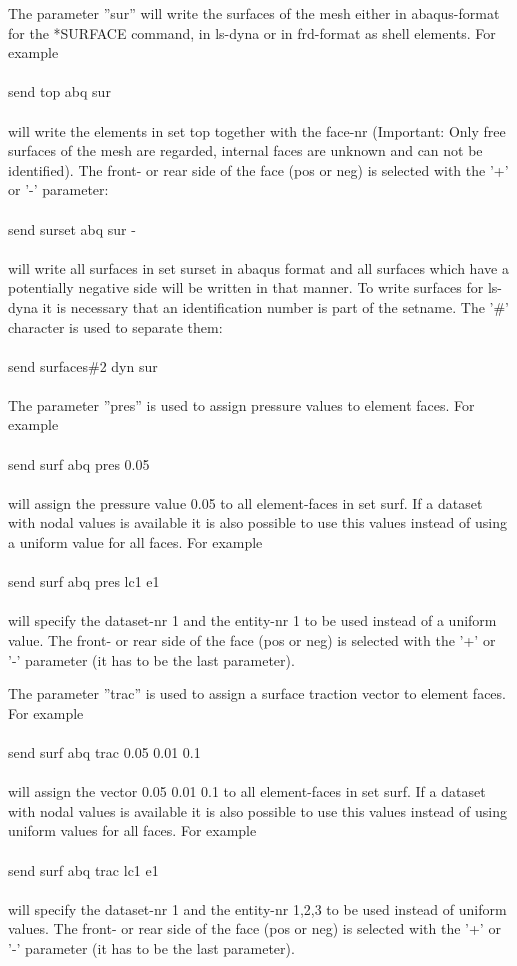 \documentclass{article}
\begin{document}
The parameter ''sur'' will write the surfaces of the mesh either in abaqus-format for the *SURFACE command, in ls-dyna or in frd-format as shell elements. For example\\\\send top abq sur\\\\will write the elements in set top together with the face-nr (Important: Only free surfaces of the mesh are regarded, internal faces are unknown and can not be identified). The front- or rear side of the face (pos or neg) is selected with the '+' or '-' parameter:\\\\send surset abq sur -\\\\will write all surfaces in set surset in abaqus format and all surfaces which have a potentially negative side will be written in that manner. To write surfaces for ls-dyna it is necessary that an identification number is part of the setname. The '\#' character is used to separate them:\\\\send surfaces\#2 dyn sur\\\\


The parameter ''pres'' is used to assign pressure values to element faces. For example\\\\send surf abq pres 0.05\\\\will assign the pressure value 0.05 to all element-faces in set surf. If a dataset with nodal values is available it is also possible to use this values instead of using a uniform value for all faces. For example\\\\send surf abq pres lc1 e1\\\\will specify the dataset-nr 1 and the entity-nr 1 to be used instead of a uniform value. The front- or rear side of the face (pos or neg) is selected with the '+' or '-' parameter (it has to be the last parameter).

The parameter ''trac'' is used to assign a surface traction vector to element faces. For example\\\\send surf abq trac 0.05 0.01 0.1\\\\will assign the vector 0.05 0.01 0.1 to all element-faces in set surf. If a dataset with nodal values is available it is also possible to use this values instead of using uniform values for all faces. For example\\\\send surf abq trac lc1 e1\\\\will specify the dataset-nr 1 and the entity-nr 1,2,3 to be used instead of uniform values. The front- or rear side of the face (pos or neg) is selected with the '+' or '-' parameter (it has to be the last parameter).
\end{document}
